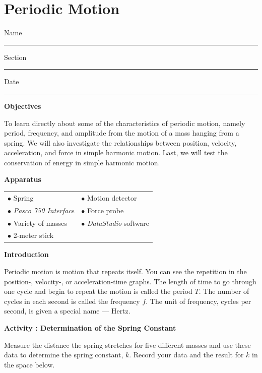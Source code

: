 \section{Periodic Motion}

Name \rule{2.0in}{0.1pt}\hfill{}Section \rule{1.0in}{0.1pt}\hfill{}Date \rule{1.0in}{0.1pt}

{\bf Objectives }

To learn directly about some of the characteristics of periodic motion, 
namely period, frequency, and amplitude from the motion of a mass hanging from a spring. 
We will also investigate the relationships between position, velocity, acceleration, 
and force in simple harmonic motion.
Last, we will test the conservation of energy in simple harmonic motion.


\textbf{Apparatus} 

\begin{tabular}{p{2.5in}p{2.5in}}
$\bullet$  Spring                         & $\bullet$  Motion detector   \\[5pt]
$\bullet$  \textit{Pasco 750 Interface}   & $\bullet$  Force probe       \\[5pt]
$\bullet$  Variety of masses              & $\bullet$  \textit{DataStudio} software \\[5pt]
$\bullet$  2-meter stick                  &  \\[5pt]
\end{tabular}


\textbf{Introduction }

Periodic motion is motion that repeats itself. You can see the repetition in
the position-, velocity-, or acceleration-time graphs. The length of time to
go through one cycle and begin to repeat the motion is called the period $T$. The
number of cycles in each second is called the frequency $f$. The unit of frequency,
cycles per second, is given a special name --- Hertz.


\textbf{Activity  : Determination of the Spring Constant }

Measure the distance the spring stretches for five different masses and use
these data to determine the spring constant, $k$. 
Record your data and the result for $k$ in the space below.
\vspace{50mm}



